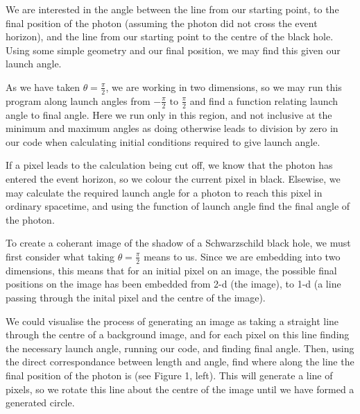 \documentclass[landscape,a2paper,fontscale=1]{baposter} %
\begin{document}
\begin{poster}
{\begin{multicols}{2}
\vspace{1em}
We are interested in the angle between the line from our starting point, to the final position of the photon (assuming the photon did not cross the event horizon), and the line from our starting point to the centre of the black hole. Using some simple geometry and our final position, we may find this given our launch angle.

\vspace{1em}
As we have taken $\theta=\frac{\pi}{2}$, we are working in two dimensions, so we may run this program along launch angles from $-\frac{\pi}{2}\mbox{ to }\frac{\pi}{2}$ and find a function relating launch angle to final angle. Here we run only in this region, and not inclusive at the minimum and maximum angles as doing otherwise leads to division by zero in our code when calculating initial conditions required to give launch angle.

\vspace{1em}
If a pixel leads to the calculation being cut off, we know that the photon has entered the event horizon, so we colour the current pixel in black. Elsewise, we may calculate the required launch angle for a photon to reach this pixel in ordinary spacetime, and using the function of launch angle find the final angle of the photon. 

\vspace{1em}
To create a coherant image of the shadow of a Schwarzschild black hole, we must first consider what taking $\theta=\frac{\pi}{2}$ means to us. Since we are embedding into two dimensions, this means that for an initial pixel on an image, the possible final positions on the image has been embedded from 2-d (the image), to 1-d (a line passing through the inital pixel and the centre of the image).

\vspace{1em}
 We could visualise the process of generating an image as taking a straight line through the centre of a background image, and for each pixel on this line finding the necessary launch angle, running our code, and finding final angle. Then, using the direct correspondance between length and angle, find where along the line the final position of the photon is (see Figure 1, left). This will generate a line of pixels, so we rotate this line about the centre of the image until we have formed a generated circle.


\end{multicols}}
\end{poster}
\end{document}
